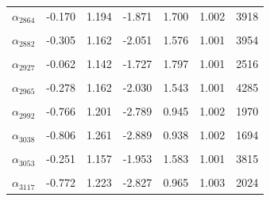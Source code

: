 \begin{longtable}{lrrrrrr}
$\alpha_{2864}$ & -0.170 & 1.194 & -1.871 & 1.700 & 1.002 & 3918\\
\cellcolor{gray!10}{$\alpha_{2866}$} & \cellcolor{gray!10}{-0.159} & \cellcolor{gray!10}{1.160} & \cellcolor{gray!10}{-1.814} & \cellcolor{gray!10}{1.636} & \cellcolor{gray!10}{1.001} & \cellcolor{gray!10}{3599}\\
$\alpha_{2882}$ & -0.305 & 1.162 & -2.051 & 1.576 & 1.001 & 3954\\
\cellcolor{gray!10}{$\alpha_{2886}$} & \cellcolor{gray!10}{-0.317} & \cellcolor{gray!10}{1.152} & \cellcolor{gray!10}{-2.139} & \cellcolor{gray!10}{1.504} & \cellcolor{gray!10}{1.004} & \cellcolor{gray!10}{3771}\\
$\alpha_{2927}$ & -0.062 & 1.142 & -1.727 & 1.797 & 1.001 & 2516\\
\cellcolor{gray!10}{$\alpha_{2957}$} & \cellcolor{gray!10}{0.183} & \cellcolor{gray!10}{1.384} & \cellcolor{gray!10}{-1.587} & \cellcolor{gray!10}{2.517} & \cellcolor{gray!10}{1.003} & \cellcolor{gray!10}{1265}\\
$\alpha_{2965}$ & -0.278 & 1.162 & -2.030 & 1.543 & 1.001 & 4285\\
\cellcolor{gray!10}{$\alpha_{2974}$} & \cellcolor{gray!10}{-0.649} & \cellcolor{gray!10}{1.160} & \cellcolor{gray!10}{-2.515} & \cellcolor{gray!10}{1.078} & \cellcolor{gray!10}{1.001} & \cellcolor{gray!10}{2996}\\
$\alpha_{2992}$ & -0.766 & 1.201 & -2.789 & 0.945 & 1.002 & 1970\\
\cellcolor{gray!10}{$\alpha_{3002}$} & \cellcolor{gray!10}{-0.290} & \cellcolor{gray!10}{1.129} & \cellcolor{gray!10}{-2.002} & \cellcolor{gray!10}{1.464} & \cellcolor{gray!10}{1.001} & \cellcolor{gray!10}{3991}\\
$\alpha_{3038}$ & -0.806 & 1.261 & -2.889 & 0.938 & 1.002 & 1694\\
\cellcolor{gray!10}{$\alpha_{3039}$} & \cellcolor{gray!10}{-0.327} & \cellcolor{gray!10}{1.188} & \cellcolor{gray!10}{-2.091} & \cellcolor{gray!10}{1.491} & \cellcolor{gray!10}{1.000} & \cellcolor{gray!10}{4660}\\
$\alpha_{3053}$ & -0.251 & 1.157 & -1.953 & 1.583 & 1.001 & 3815\\
\cellcolor{gray!10}{$\alpha_{3116}$} & \cellcolor{gray!10}{-0.262} & \cellcolor{gray!10}{1.156} & \cellcolor{gray!10}{-1.962} & \cellcolor{gray!10}{1.522} & \cellcolor{gray!10}{1.002} & \cellcolor{gray!10}{3965}\\
$\alpha_{3117}$ & -0.772 & 1.223 & -2.827 & 0.965 & 1.003 & 2024\\

\end{longtable}
